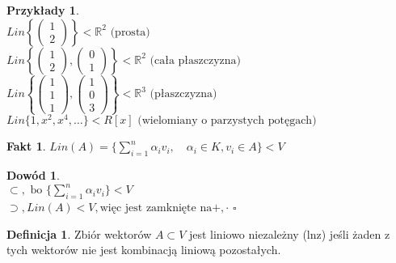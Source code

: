 \documentclass[12pt,a4paper]{article}
\newcommand{\RR}{\mathbb{R}}
\renewcommand{\qed}{$\square$}
\theoremstyle{plain}
\theoremstyle{definition}
\newtheorem{ft}{Fakt}[section]
\theoremstyle{definition}
\newtheorem{df}{Definicja}[section]
\theoremstyle{definition}
\theoremstyle{definition}
\newtheorem*{dd}{Dowód}
\theoremstyle{definition}
\theoremstyle{definition}
\newtheorem*{przy}{Przykłady}
\theoremstyle{definition}
\begin{document}
\begin{przy}
    ~\\ 
    $Lin\left\{
        \begin{pmatrix}
            1 \\ 
            2
        \end{pmatrix}
    \right\} < \RR^2 \text{ (prosta)}
    $ \\
    $Lin\left\{
        \begin{pmatrix}
            1 \\ 
            2
        \end{pmatrix}, 
        \begin{pmatrix}
            0 \\ 
            1
        \end{pmatrix}
        \right\} < \RR^2 \text{ (cała płaszczyzna)}
    $\\ 
    $
        Lin\left\{
        \begin{pmatrix}
            1 \\ 
            1 \\
            1
        \end{pmatrix}, 
        \begin{pmatrix}
            1 \\ 
            0 \\
            3
        \end{pmatrix}
        \right\} < \RR^3 \text{ (płaszczyzna)}
    $ \\
    $
        Lin\{1,x^2,x^4,\dots\} < R[x] \text{ (wielomiany o parzystych potęgach)}
    $
\end{przy}

\begin{ft}
    $Lin(A) = \{ \sum\limits_{i=1}^{n} \alpha_i v_i, \quad \alpha_i \in K, v_i \in A\} < V$
\end{ft}

\begin{dd}
    ~\\
    $\subset, \text{ bo } \{ \sum\limits_{i=1}^{n} \alpha_i v_i\} < V$ \\
    $\supset, Lin(A) < V, \text{więc jest zamknięte na} +,\cdot$
    \qed
\end{dd}

\begin{df}
    Zbiór wektorów $ A \subset V $ jest liniowo niezależny (lnz) jeśli żaden z tych wektorów nie jest kombinacją liniową pozostałych.
\end{df}
\end{document}
